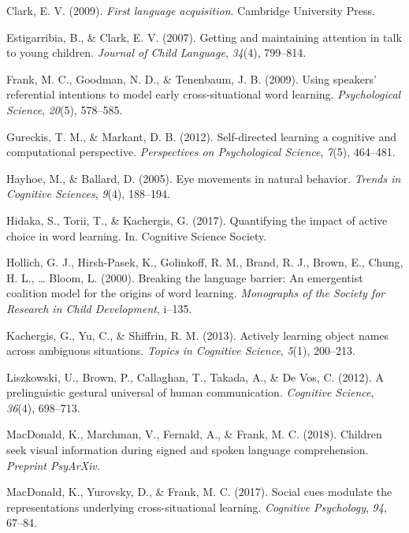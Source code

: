 \documentclass[man,floatsintext]{apa6}
\begin{document}
\hypertarget{ref-clark2009first}{}
Clark, E. V. (2009). \emph{First language acquisition}. Cambridge
University Press.

\hypertarget{ref-estigarribia2007getting}{}
Estigarribia, B., \& Clark, E. V. (2007). Getting and maintaining
attention in talk to young children. \emph{Journal of Child Language},
\emph{34}(4), 799--814.

\hypertarget{ref-frank2009using}{}
Frank, M. C., Goodman, N. D., \& Tenenbaum, J. B. (2009). Using
speakers' referential intentions to model early cross-situational word
learning. \emph{Psychological Science}, \emph{20}(5), 578--585.

\hypertarget{ref-gureckis2012self}{}
Gureckis, T. M., \& Markant, D. B. (2012). Self-directed learning a
cognitive and computational perspective. \emph{Perspectives on
Psychological Science}, \emph{7}(5), 464--481.

\hypertarget{ref-hayhoe2005eye}{}
Hayhoe, M., \& Ballard, D. (2005). Eye movements in natural behavior.
\emph{Trends in Cognitive Sciences}, \emph{9}(4), 188--194.

\hypertarget{ref-hidaka2017quantifying}{}
Hidaka, S., Torii, T., \& Kachergis, G. (2017). Quantifying the impact
of active choice in word learning. In. Cognitive Science Society.

\hypertarget{ref-hollich2000breaking}{}
Hollich, G. J., Hirsh-Pasek, K., Golinkoff, R. M., Brand, R. J., Brown,
E., Chung, H. L., \ldots{} Bloom, L. (2000). Breaking the language
barrier: An emergentist coalition model for the origins of word
learning. \emph{Monographs of the Society for Research in Child
Development}, i--135.

\hypertarget{ref-kachergis2013actively}{}
Kachergis, G., Yu, C., \& Shiffrin, R. M. (2013). Actively learning
object names across ambiguous situations. \emph{Topics in Cognitive
Science}, \emph{5}(1), 200--213.

\hypertarget{ref-liszkowski2012prelinguistic}{}
Liszkowski, U., Brown, P., Callaghan, T., Takada, A., \& De Vos, C.
(2012). A prelinguistic gestural universal of human communication.
\emph{Cognitive Science}, \emph{36}(4), 698--713.

\hypertarget{ref-macdonald2018speed}{}
MacDonald, K., Marchman, V., Fernald, A., \& Frank, M. C. (2018).
Children seek visual information during signed and spoken language
comprehension. \emph{Preprint PsyArXiv}.

\hypertarget{ref-macdonald2017social}{}
MacDonald, K., Yurovsky, D., \& Frank, M. C. (2017). Social cues
modulate the representations underlying cross-situational learning.
\emph{Cognitive Psychology}, \emph{94}, 67--84.
\end{document}

